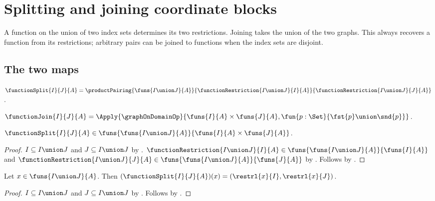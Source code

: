 \section{Splitting and joining coordinate blocks}





A function on the union of two index sets determines its two restrictions.
Joining takes the union of the two graphs. This always recovers a function
from its restrictions; arbitrary pairs can be joined to functions when the
index sets are disjoint.

\subsection{The two maps}

\begin{definition}\label{function_split}
    $\functionSplit{I}{J}{A}=\productPairing{\funs{I\union J}{A}}{
        \functionRestriction{I\union J}{I}{A}}{\functionRestriction{I\union J}{J}{A}}$.
\end{definition}

\begin{definition}\label{function_join}
    $\functionJoin{I}{J}{A}=\Apply{\graphOnDomainOp}{
        \funs{I}{A}\times\funs{J}{A},\fun{p:\Set}{\fst{p}\union\snd{p}}}$.
\end{definition}

\begin{proposition}\label{function_split_type}
    $\functionSplit{I}{J}{A}\in
        \funs{\funs{I\union J}{A}}{\funs{I}{A}\times\funs{J}{A}}$.
\end{proposition}
\begin{proof}
    $I\subseteq I\union J$ and $J\subseteq I\union J$ by .
    $\functionRestriction{I\union J}{I}{A}\in\funs{\funs{I\union J}{A}}{\funs{I}{A}}$ and
        $\functionRestriction{I\union J}{J}{A}\in\funs{\funs{I\union J}{A}}{\funs{J}{A}}$ by
        .
    Follows by .
\end{proof}

\begin{proposition}\label{function_split_apply}
    Let $x\in\funs{I\union J}{A}$.
    Then $(\functionSplit{I}{J}{A})(x)=(\restrl{x}{I},\restrl{x}{J})$.
\end{proposition}
\begin{proof}
    $I\subseteq I\union J$ and $J\subseteq I\union J$ by .
    Follows by .
\end{proof}


